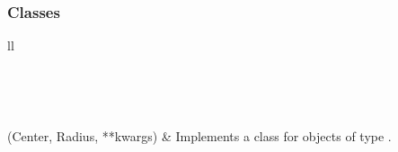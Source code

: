 \documentclass[letterpaper,10pt,english]{sphinxmanual}
\begin{document}
\subsubsection{Classes}
\label{Chapters/PythonModuleReference/Patterns/TXLWizard.Patterns.Circle:classes}
\begin{longtable}{ll}
\hline
\endfirsthead

%
{{}} \\
\hline
\endhead

\hline {} \\ \hline
\endfoot

\endlastfoot


{\hyperref[Chapters/PythonModuleReference/Patterns/TXLWizard.Patterns.Circle:TXLWizard.Patterns.Circle.Circle]{}}(Center, Radius, **kwargs)
 & 
Implements a class for  objects of type .
\\
\hline\end{longtable}

\end{document}
